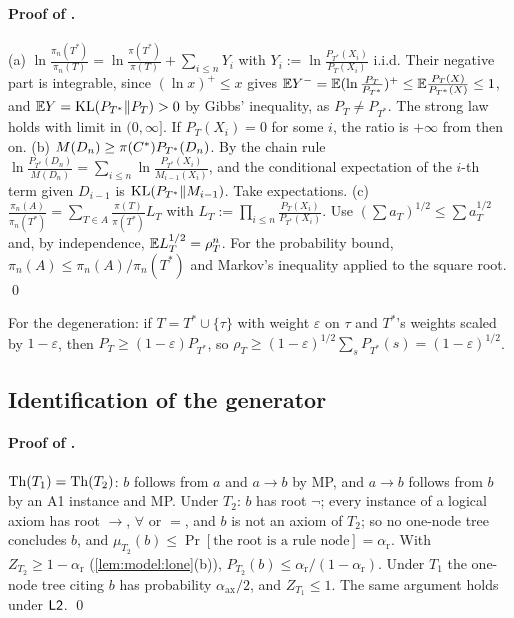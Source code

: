 \paragraph{Proof of .}
(a) $\ln\frac{\pi_n(T^*)}{\pi_n(T)}=\ln\frac{\pi(T^*)}{\pi(T)}+\sum_{i\le n}Y_i$ with $Y_i:=\ln\frac{P_{T^*}(X_i)}{P_T(X_i)}$ i.i.d. Their negative part is integrable, since $(\ln x)^+\le x$ gives $\mathbb{E} Y^-=\mathbb{E}(\ln\frac{P_T}{P_{T^*}})^+\le\mathbb{E}\frac{P_T(X)}{P_{T^*}(X)}\le1$, and $\mathbb{E} Y=\mathrm{KL}(P_{T^*}\|P_T)>0$ by Gibbs' inequality, as $P_T\ne P_{T^*}$. The strong law holds with limit in $(0,\infty]$. If $P_T(X_i)=0$ for some $i$, the ratio is $+\infty$ from then on.
(b) $M(D_n)\ge\pi(C^{*})P_{T^*}(D_n)$. By the chain rule $\ln\frac{P_{T^*}(D_n)}{M(D_n)}=\sum_{i\le n}\ln\frac{P_{T^*}(X_i)}{M_{i-1}(X_i)}$, and the conditional expectation of the $i$-th term given $D_{i-1}$ is $\mathrm{KL}(P_{T^*}\|M_{i-1})$. Take expectations.
(c) $\frac{\pi_n(A)}{\pi_n(T^*)}=\sum_{T\in A}\frac{\pi(T)}{\pi(T^*)}L_T$ with $L_T:=\prod_{i\le n}\frac{P_T(X_i)}{P_{T^*}(X_i)}$. Use $(\sum a_T)^{1/2}\le\sum a_T^{1/2}$ and, by independence, $\mathbb{E} L_T^{1/2}=\rho_T^n$. For the probability bound, $\pi_n(A)\le\pi_n(A)/\pi_n(T^*)$ and Markov's inequality applied to the square root. \qed

For the degeneration: if $T=T^*\cup\{\tau\}$ with weight $\varepsilon$ on $\tau$ and $T^*$'s weights scaled by $1-\varepsilon$, then $P_T\ge(1-\varepsilon)P_{T^*}$, so $\rho_T\ge(1-\varepsilon)^{1/2}\sum_sP_{T^*}(s)=(1-\varepsilon)^{1/2}$.

\subsection{Identification of the generator}\label{app:ident:gen}

\paragraph{Proof of .} $\mathrm{Th}(T_1)=\mathrm{Th}(T_2)$: $b$ follows from $a$ and $a\to b$ by MP, and $a\to b$ follows from $b$ by an A1 instance and MP. Under $T_2$: $b$ has root $\neg$; every instance of a logical axiom has root $\to$, $\forall$ or $=$, and $b$ is not an axiom of $T_2$; so no one-node tree concludes $b$, and $\mu_{T_2}(b)\le\Pr[\text{the root is a rule node}]=\alpha_{\mathrm r}$. With $Z_{T_2}\ge1-\alpha_{\mathrm r}$ (\cref{lem:model:lone}(b)), $P_{T_2}(b)\le\alpha_{\mathrm r}/(1-\alpha_{\mathrm r})$. Under $T_1$ the one-node tree citing $b$ has probability $\alpha_{\mathrm{ax}}/2$, and $Z_{T_1}\le1$. The same argument holds under $\mathord{\mathsf{L2}}$. \qed

